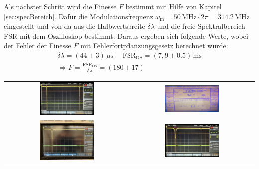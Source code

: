 Als nächster Schritt wird die Finesse $F$ bestimmt mit Hilfe von Kapitel \ref{sec:specBereich}. Dafür die Modulationsfrequenz $\omega_\mathrm{m} = 50\,\mathrm{MHz} \cdot 2\pi = 314.2\,\mathrm{MHz}$ eingestellt und von da aus die Halbwertsbreite $\delta \lambda$ und die freie Spektralbereich FSR mit dem Oszilloskop bestimmt. Daraus ergeben sich folgende Werte, wobei der Fehler der Finesse $F$ mit Fehlerfortpflanzungsgesetz berechnet wurde:
\begin{gather}
    \delta \lambda = ( 44 \pm 3)\,\mu\mathrm{s}~~~~~~\mathrm{FSR}_\mathrm{OS} = (7,9 \pm 0.5)\,\mathrm{ms}\\[0,5cm]
    \Rightarrow \boxed{F = \frac{\mathrm{FSR}_\mathrm{OS}}{\delta \lambda} = (180 \pm 17)}
\end{gather}
\vspace{2cm}
\begin{center}
    \captionsetup{type=figure}
    \begin{tabular}{c c}
        \includegraphics[width=0.45\textwidth]{Bilder/Finess/finess_fsr_oszi.jpg} & \includegraphics[width=0.45\textwidth]{Bilder/Finess/finess_hf-generator.jpg}\\
        \includegraphics[width=0.45\textwidth]{Bilder/Finess/finess_max_oszi.jpg} & \includegraphics[width=0.45\textwidth]{Bilder/Finess/finess_hb_oszi.jpg}\\

\end{tabular}
\end{center}
